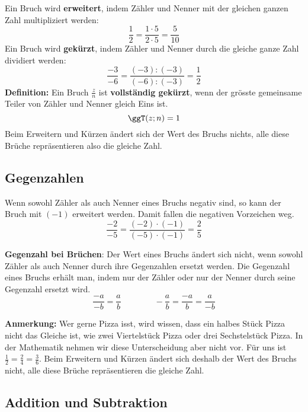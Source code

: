 Ein Bruch wird \textbf{erweitert}, indem Zähler und Nenner mit der gleichen ganzen Zahl multipliziert werden:
\[
  \frac{1}{2} = \frac{1\cdot 5}{2\cdot 5} = \frac{5}{10}
\]
Ein Bruch wird \textbf{gekürzt}, indem Zähler und Nenner durch die gleiche ganze Zahl dividiert werden:
\[
  \frac{-3}{-6} = \frac{(-3):(-3)}{(-6):(-3)} = \frac{1}{2}
\]
\textbf{Definition:} Ein Bruch $\frac{z}{n}$ ist \textbf{vollständig gekürzt}, wenn der grösste gemeinsame Teiler von Zähler und Nenner gleich Eins ist.
\[
  \ggT(z;n) = 1
\]
Beim Erweitern und Kürzen ändert sich der Wert des Bruchs nichts, alle diese Brüche repräsentieren also die gleiche Zahl.

\subsection{Gegenzahlen}

Wenn sowohl Zähler als auch Nenner eines Bruchs negativ sind, so kann der Bruch mit $(-1)$ erweitert werden. Damit fallen die negativen Vorzeichen weg.
\[
  \frac{-2}{-5} = \frac{(-2)\cdot(-1)}{(-5)\cdot(-1)} = \frac{2}{5}
\]
\begin{theorem}
  \textbf{Gegenzahl bei Brüchen}: Der Wert eines Bruchs ändert sich nicht, wenn sowohl Zähler als auch Nenner durch ihre Gegenzahlen ersetzt werden. Die Gegenzahl eines Bruchs erhält man, indem nur der Zähler oder nur der Nenner durch seine Gegenzahl ersetzt wird.
  \[
    \frac{-a}{-b} = \frac{a}{b} \qquad\qquad -\frac{a}{b} = \frac{-a}{b} = \frac{a}{-b}
  \]
\end{theorem}

\textbf{Anmerkung:} Wer gerne Pizza isst, wird wissen, dass ein halbes Stück Pizza nicht das Gleiche ist, wie zwei Viertelstück Pizza oder drei Sechstelstück Pizza. In der Mathematik nehmen wir diese Unterscheidung aber nicht vor. Für uns ist $\frac{1}{2} = \frac{2}{4} = \frac{3}{6}$. Beim Erweitern und Kürzen ändert sich deshalb der Wert des Bruchs nicht, alle diese Brüche repräsentieren die gleiche Zahl.

\subsection{Addition und Subtraktion}

